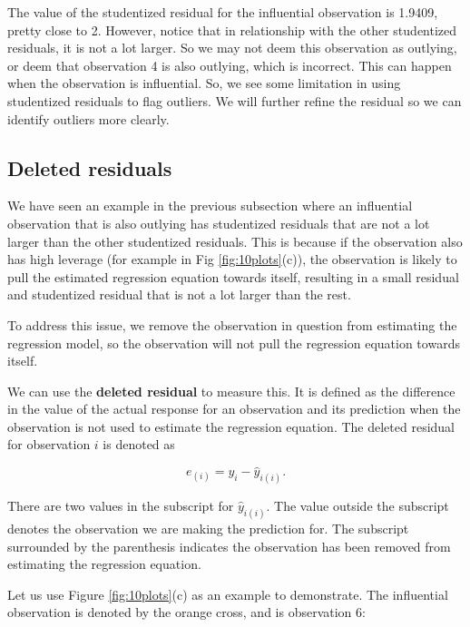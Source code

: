 \documentclass[
]{book}
\begin{document}
The value of the studentized residual for the influential observation is 1.9409, pretty close to 2. However, notice that in relationship with the other studentized residuals, it is not a lot larger. So we may not deem this observation as outlying, or deem that observation 4 is also outlying, which is incorrect. This can happen when the observation is influential. So, we see some limitation in using studentized residuals to flag outliers. We will further refine the residual so we can identify outliers more clearly.

\hypertarget{deleted-residuals}{%
\subsection{Deleted residuals}\label{deleted-residuals}}

We have seen an example in the previous subsection where an influential observation that is also outlying has studentized residuals that are not a lot larger than the other studentized residuals. This is because if the observation also has high leverage (for example in Fig \ref{fig:10plots}(c)), the observation is likely to pull the estimated regression equation towards itself, resulting in a small residual and studentized residual that is not a lot larger than the rest.

To address this issue, we remove the observation in question from estimating the regression model, so the observation will not pull the regression equation towards itself.

We can use the \textbf{deleted residual} to measure this. It is defined as the difference in the value of the actual response for an observation and its prediction when the observation is not used to estimate the regression equation. The deleted residual for observation \(i\) is denoted as

\begin{equation} 
e_{(i)}=y_i-\hat{y}_{i(i)}.
\label{eq:10deleted}
\end{equation}

There are two values in the subscript for \(\hat{y}_{i(i)}\). The value outside the subscript denotes the observation we are making the prediction for. The subscript surrounded by the parenthesis indicates the observation has been removed from estimating the regression equation.

Let us use Figure \ref{fig:10plots}(c) as an example to demonstrate. The influential observation is denoted by the orange cross, and is observation 6:
\end{document}
